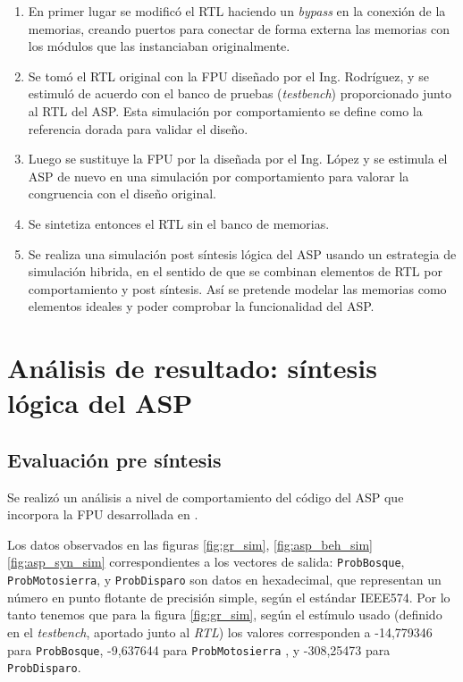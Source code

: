 \begin{enumerate}

\item En primer lugar se modificó el RTL haciendo un \textit{bypass} en la conexión de la memorias, creando puertos para conectar de forma externa las memorias con los módulos que las instanciaban originalmente.

\item Se tomó el RTL original con la FPU diseñado por el Ing. Rodríguez, y se estimuló de acuerdo con el banco de pruebas (\textit{testbench}) proporcionado junto al RTL del ASP. Esta simulación por comportamiento se define como la referencia dorada para validar el diseño.

\item Luego se sustituye la FPU por la diseñada por el Ing. López y se estimula el ASP de nuevo en una simulación por comportamiento para valorar la congruencia con el diseño original.

\item Se sintetiza entonces el RTL sin el banco de memorias.

\item Se realiza una simulación post síntesis lógica del ASP usando un estrategia de simulación hibrida, en el sentido de que se combinan elementos de RTL por comportamiento y post síntesis. Así se pretende modelar las memorias como elementos ideales y poder comprobar la funcionalidad del ASP.
\end{enumerate}


\section{Análisis de resultado: síntesis lógica del ASP}

\subsection{Evaluación pre síntesis}

Se realizó un análisis a nivel de comportamiento del código del ASP que incorpora la FPU desarrollada en \cite{Diego2015}.

Los datos observados en las figuras \ref{fig:gr_sim}, \ref{fig:asp_beh_sim} \ref{fig:asp_syn_sim} correspondientes a los vectores de salida: \texttt{ProbBosque}, \texttt{ProbMotosierra}, y \texttt{ProbDisparo} son datos en hexadecimal, que representan un número en punto flotante de precisión simple, según el estándar IEEE574. Por lo tanto tenemos que para la figura \ref{fig:gr_sim}, según el estímulo usado (definido en el \textit{testbench}, aportado junto al \textit{RTL}) los valores corresponden a -14,779346 para \texttt{ProbBosque}, -9,637644 para \texttt{ProbMotosierra} , y -308,25473 para \texttt{ProbDisparo}.

